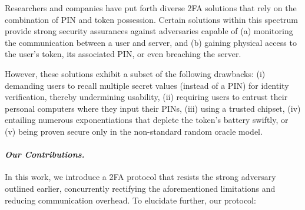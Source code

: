 

Researchers and companies have put forth diverse 2FA solutions that rely on the combination of PIN and token possession. Certain solutions within this spectrum provide strong security assurances against adversaries capable of (a) monitoring the communication between a user and server, and (b) gaining physical access to the user's token, its associated PIN, or even breaching the server.


However, these solutions exhibit a subset of the following drawbacks:  (i) demanding users to recall multiple secret values (instead of a PIN) for identity verification, thereby undermining usability, (ii) requiring users to entrust their personal computers where they input their PINs, (iii) using a trusted chipset,  (iv) entailing numerous exponentiations that deplete the token's battery swiftly, or (v) being proven secure only in the non-standard random oracle model.







\paragraph{\textbf{\textit{Our Contributions.}}}  In this work, we introduce a 2FA protocol that resists the strong adversary outlined earlier, concurrently rectifying the aforementioned limitations and reducing communication overhead. To elucidate further, our protocol:

